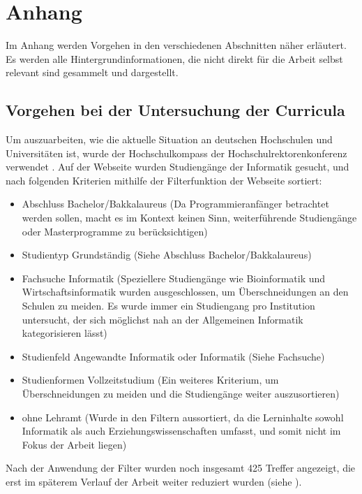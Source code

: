 \clearpage
\section{Anhang}
\label{sec:appendix}

Im Anhang werden Vorgehen in den verschiedenen Abschnitten näher erläutert. Es werden alle Hintergrundinformationen, die nicht direkt für die Arbeit selbst relevant sind gesammelt und dargestellt.

\subsection{Vorgehen bei der Untersuchung der Curricula}
Um auszuarbeiten, wie die aktuelle Situation an deutschen Hochschulen und Universitäten ist, wurde der Hochschulkompass der Hochschulrektorenkonferenz verwendet \cite{hochschulkompass}.
Auf der Webseite wurden Studiengänge der Informatik gesucht, und nach folgenden Kriterien mithilfe der Filterfunktion der Webseite sortiert:

\begin{itemize}
    \item Abschluss Bachelor/Bakkalaureus (Da Programmieranfänger betrachtet werden sollen, macht es im Kontext keinen Sinn, weiterführende Studiengänge oder Masterprogramme zu berücksichtigen)
    \item Studientyp Grundständig (Siehe Abschluss Bachelor/Bakkalaureus)
    \item Fachsuche Informatik (Speziellere Studiengänge wie Bioinformatik und Wirtschaftsinformatik wurden ausgeschlossen, um Überschneidungen an den Schulen zu meiden. Es wurde immer ein Studiengang pro Institution untersucht, der sich möglichst nah an der Allgemeinen Informatik kategorisieren lässt)
    \item Studienfeld Angewandte Informatik oder Informatik (Siehe Fachsuche)
    \item Studienformen Vollzeitstudium (Ein weiteres Kriterium, um Überschneidungen zu meiden und die Studiengänge weiter auszusortieren)
    \item ohne Lehramt (Wurde in den Filtern aussortiert, da die Lerninhalte sowohl Informatik als auch Erziehungswissenschaften umfasst, und somit nicht im Fokus der Arbeit liegen)
\end{itemize}

Nach der Anwendung der Filter wurden noch insgesamt 425 Treffer angezeigt, die erst im späterem Verlauf der Arbeit weiter reduziert wurden (siehe ).

